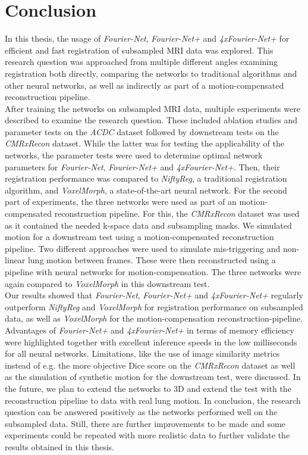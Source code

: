 
\chapter{Conclusion} \label{Ch:Conclusion}
In this thesis, the usage of \emph{Fourier-Net}, \emph{Fourier-Net+} and \emph{4xFourier-Net+} for efficient and fast registration of subsampled MRI data was explored. This research question was approached from multiple different angles examining registration both directly, comparing the networks to traditional algorithms and other neural networks, as well as indirectly as part of a motion-compensated reconstruction pipeline. \\
After training the networks on subsampled MRI data, multiple experiments were described to examine the research question. These included ablation studies and parameter tests on the \emph{ACDC} dataset followed by downstream tests on the \emph{CMRxRecon} dataset. While the latter was for testing the applicability of the networks, the parameter tests were used to determine optimal network parameters for \emph{Fourier-Net}, \emph{Fourier-Net+} and \emph{4xFourier-Net+}. Then, their registration performance was compared to \emph{NiftyReg}, a traditional registration algorithm, and \emph{VoxelMorph}, a state-of-the-art neural network. For the second part of experiments, the three networks were used as part of an motion-compensated reconstruction pipeline. For this, the \emph{CMRxRecon} dataset was used as it contained the needed k-space data and subsampling masks. We simulated motion for a downstream test using a motion-compensated reconstruction pipeline. Two different approaches were used to simulate mis-triggering and non-linear lung motion between frames. These were then reconstructed using a pipeline with neural networks for motion-compensation. The three networks were again compared to \emph{VoxelMorph} in this downstream test.\\
Our results showed that \emph{Fourier-Net}, \emph{Fourier-Net+} and \emph{4xFourier-Net+} regularly outperform \emph{NiftyReg} and \emph{VoxelMorph} for registration performance on subsampled data, as well as \emph{VoxelMorph} for the motion-compensation reconstruction-pipeline. Advantages of \emph{Fourier-Net+} and \emph{4xFourier-Net+} in terms of memory efficiency were highlighted together with excellent inference speeds in the low milliseconds for all neural networks. Limitations, like the use of image similarity metrics instead of e.g. the more objective Dice score on the \emph{CMRxRecon} dataset as well as the simulation of synthetic motion for the downstream test, were discussed. In the future, we plan to extend the networks to 3D and extend the test with the reconstruction pipeline to data with real lung motion. In conclusion, the research question can be answered positively as the networks performed well on the subsampled data. Still, there are further improvements to be made and some experiments could be repeated with more realistic data to further validate the results obtained in this thesis.